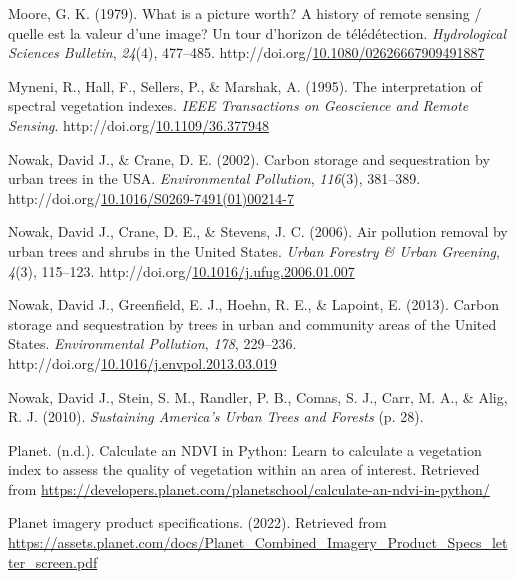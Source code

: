 \documentclass[12pt,twoside]{reedthesis}
\newlength{\cslhangindent}
\newenvironment{CSLReferences}[2] %
 {%
  \setlength{\parindent}{0pt}
  \ifodd #1 \everypar{\setlength{\hangindent}{\cslhangindent}}\ignorespaces\fi
  \ifnum #2 > 0
  \setlength{\parskip}{#2\baselineskip}
  \fi
 }%
 {}
\begin{document}
\begin{CSLReferences}{1}{0}
\leavevmode{}%
Moore, G. K. (1979). What is a picture worth? A history of remote sensing / quelle est la valeur d'une image? Un tour d'horizon de télédétection. \emph{Hydrological Sciences Bulletin}, \emph{24}(4), 477--485. http://doi.org/\href{https://doi.org/10.1080/02626667909491887}{10.1080/02626667909491887}

\leavevmode{}%
Myneni, R., Hall, F., Sellers, P., \& Marshak, A. (1995). The interpretation of spectral vegetation indexes. \emph{IEEE Transactions on Geoscience and Remote Sensing}. http://doi.org/\href{https://doi.org/10.1109/36.377948}{10.1109/36.377948}

\leavevmode{}%
Nowak, David J., \& Crane, D. E. (2002). Carbon storage and sequestration by urban trees in the USA. \emph{Environmental Pollution}, \emph{116}(3), 381--389. http://doi.org/\href{https://doi.org/10.1016/S0269-7491(01)00214-7}{10.1016/S0269-7491(01)00214-7}

\leavevmode{}%
Nowak, David J., Crane, D. E., \& Stevens, J. C. (2006). Air pollution removal by urban trees and shrubs in the United States. \emph{Urban Forestry \& Urban Greening}, \emph{4}(3), 115--123. http://doi.org/\href{https://doi.org/10.1016/j.ufug.2006.01.007}{10.1016/j.ufug.2006.01.007}

\leavevmode{}%
Nowak, David J., Greenfield, E. J., Hoehn, R. E., \& Lapoint, E. (2013). Carbon storage and sequestration by trees in urban and community areas of the United States. \emph{Environmental Pollution}, \emph{178}, 229--236. http://doi.org/\href{https://doi.org/10.1016/j.envpol.2013.03.019}{10.1016/j.envpol.2013.03.019}

\leavevmode{}%
Nowak, David J., Stein, S. M., Randler, P. B., Comas, S. J., Carr, M. A., \& Alig, R. J. (2010). \emph{Sustaining America{'}s Urban Trees and Forests} (p. 28).

\leavevmode{}%
Planet. (n.d.). Calculate an NDVI in Python: Learn to calculate a vegetation index to assess the quality of vegetation within an area of interest. Retrieved from \url{https://developers.planet.com/planetschool/calculate-an-ndvi-in-python/}

\leavevmode{}%
Planet imagery product specifications. (2022). Retrieved from \url{https://assets.planet.com/docs/Planet_Combined_Imagery_Product_Specs_letter_screen.pdf}


\end{CSLReferences}
\end{document}
